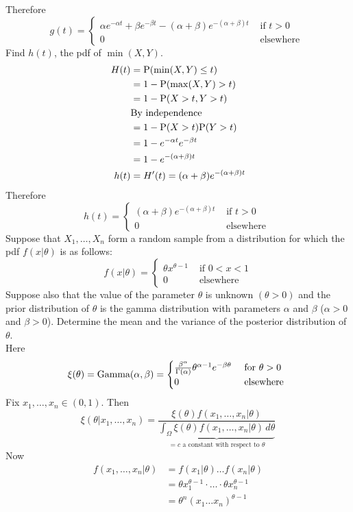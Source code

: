 \documentclass[12pt]{article}
\begin{document}
Therefore $$g(t) = \begin{cases} \alpha e^{-\alpha t} + \beta e^{-\beta t} - (\alpha + \beta)e^{-(\alpha + \beta)t} &\text{ if } t > 0 \\ 0 &\text{ elsewhere } \end{cases} $$ 
Find $h(t)$, the pdf of $\min(X,Y)$. 
$$ \begin{aligned} H(t) &= \mathrm{P}( \min(X,Y) \leq t ) \\ &= 1 - \mathrm{P}( \max(X,Y) > t ) \\ &= 1 - \mathrm{P}( X>t, Y>t ) \\ &\text{By independence} \\ &= 1 - \mathrm{P}( X > t )\mathrm{P}( Y > t ) \\ &= 1 - e^{-\alpha t}e^{-\beta t} \\ &= 1 - e^{-(\alpha + \beta)t} \\ h(t) &= H'(t) = (\alpha + \beta)e^{-(\alpha + \beta)t} \end{aligned} $$ 
Therefore $$ h(t) = \begin{cases} (\alpha + \beta)e^{-(\alpha + \beta)t} &\text{ if } t > 0 \\ 0 &\text{ elsewhere }\end{cases} $$ 
Suppose that $X_1,\dots,X_n$ form a random sample from a distribution for which the pdf $f(x|\theta)$ is as follows: $$ f(x|\theta) = \begin{cases} \theta x^{\theta - 1} &\text{ if } 0 < x < 1 \\ 0 &\text{ elsewhere} \end{cases}$$ 
Suppose also that the value of the parameter $\theta$ is unknown $(\theta > 0)$ and the prior distribution of $\theta$ is the gamma distribution with parameters $\alpha$ and $\beta$ ($\alpha > 0$ and $\beta > 0$). Determine the mean and the variance of the posterior distribution of $\theta$. \\
Here $$\xi(\theta) = \text{Gamma}( \alpha,\beta ) = \begin{cases} \frac{\beta^\alpha}{\Gamma(\alpha)} \theta^{\alpha - 1} e^{-\beta \theta} &\text{ for } \theta > 0 \\ 0 &\text{ elsewhere } \end{cases} $$ 
Fix $x_1,\dots,x_n \in (0,1)$. Then $$ \xi(\theta | x_1,\dots,x_n) = \frac{\xi(\theta)f(x_1,\dots,x_n|\theta)}{\underbrace{\int_\Omega \xi(\theta)f(x_1,\dots,x_n|\theta)\, d\theta}_{= c \text{ a constant with respect to } \theta}} $$ 
Now $$ \begin{aligned} f(x_1,\dots,x_n|\theta) &= f(x_1|\theta)\dots f(x_n|\theta) \\ &= \theta x_1^{\theta - 1} \cdot \dots \cdot \theta x_n^{\theta - 1} \\ &= \theta^n(x_1\dots x_n)^{\theta - 1} \end{aligned} $$ 
\end{document}
